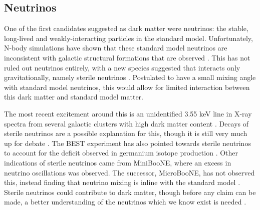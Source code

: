 \subsection{Neutrinos}
\par
One of the first candidates suggested as dark matter were neutrinos: the stable, long-lived and weakly-interacting particles in the standard model.
Unfortunately, N-body simulations have shown that these standard model neutrinos are inconsistent with galactic structural formations that are observed \cite{neutrinos_and_galaxy_clustering_ref}. 
This has not ruled out neutrinos entirely, with a new species suggested that interacts only gravitationally, namely sterile neutrinos \cite{sterile_neutrinos_ref}.
Postulated to have a small mixing angle with standard model neutrinos, this would allow for limited interaction between this dark matter and standard model matter.
\par
The most recent excitement around this is an unidentified 3.55 keV line in X-ray spectra from several galactic clusters with high dark matter content \cite{sterile_neutrino_xray_decay_ref}.
Decays of sterile neutrinos are a possible explanation for this, though it is still very much up for debate \cite{xray_from_sterile_neutrons_2_ref, xray_from_sterile_neutrons_3_ref}.
The BEST experiment has also pointed towards sterile neutrinos to account for the deficit observed in germanium isotope production \cite{best_sterile_neutrino_result_ref,best_sterile_neutrino_2_ref}.
Other indications of sterile neutrinos came from MiniBooNE, where an excess in neutrino oscillations was observed.
The successor, MicroBooNE, has not observed this, instead finding that neutrino mixing is inline with the standard model \cite{miniboone_and_microboone_sterile_neutrino_ref}.
Sterile neutrinos could contribute to dark matter, though before any claim can be made, a better understanding of the neutrinos which we know exist is needed \cite{sterile_neutrino_as_dm_ref, sterile_neutrinos_dm_ref}.

